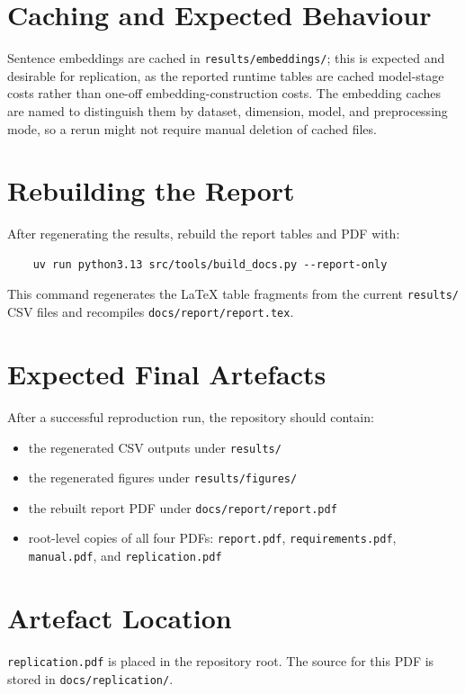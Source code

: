 \documentclass[10pt,a4paper]{article}
\begin{document}
\section{Caching and Expected Behaviour}

Sentence embeddings are cached in \texttt{results/embeddings/}; this is expected and desirable for replication, as the reported runtime tables are cached model-stage costs rather than one-off embedding-construction costs. The embedding caches are named to distinguish them by dataset, dimension, model, and preprocessing mode, so a rerun might not require manual deletion of cached files.


\section{Rebuilding the Report}

After regenerating the results, rebuild the report tables and PDF with:

\begin{verbatim}
    uv run python3.13 src/tools/build_docs.py --report-only
\end{verbatim}

This command regenerates the \LaTeX{} table fragments from the current \texttt{results/} CSV files and recompiles \texttt{docs/report/report.tex}.


\section{Expected Final Artefacts}

After a successful reproduction run, the repository should contain:

\begin{itemize}
    \item the regenerated CSV outputs under \texttt{results/}
    \item the regenerated figures under \texttt{results/figures/}
    \item the rebuilt report PDF under \texttt{docs/report/report.pdf}
    \item root-level copies of all four PDFs: \texttt{report.pdf}, \texttt{requirements.pdf}, \texttt{manual.pdf}, and \texttt{replication.pdf}
\end{itemize}


\section{Artefact Location}

\texttt{replication.pdf} is placed in the repository root. The source for this PDF is stored in \texttt{docs/replication/}.
\end{document}
